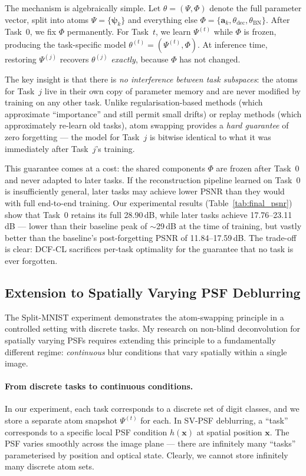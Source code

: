 \documentclass[11pt,letterpaper]{article}
\newcommand{\avec}{\mathbf{a}}
\newcommand{\psivec}{\boldsymbol{\psi}}
\begin{document}
The mechanism is algebraically simple.  Let
$\theta = (\Psi, \Phi)$ denote the full parameter vector, split into atoms
$\Psi = \{\psivec_k\}$ and everything else
$\Phi = \{\avec_k, \theta_\text{dec}, \theta_\text{BN}\}$.  After Task~0, we
fix $\Phi$ permanently.  For Task~$t$, we learn $\Psi^{(t)}$ while $\Phi$
is frozen, producing the task-specific model
$\theta^{(t)} = (\Psi^{(t)}, \Phi)$.  At inference time, restoring
$\Psi^{(j)}$ recovers $\theta^{(j)}$ \emph{exactly}, because $\Phi$ has not
changed.

The key insight is that there is \emph{no interference between task
subspaces}: the atoms for Task~$j$ live in their own copy of parameter memory
and are never modified by training on any other task.  Unlike
regularisation-based methods (which approximate ``importance'' and still permit
small drifts) or replay methods (which approximately re-learn old tasks), atom
swapping provides a \emph{hard guarantee} of zero forgetting --- the model for
Task~$j$ is bitwise identical to what it was immediately after Task~$j$'s
training.

This guarantee comes at a cost: the shared components $\Phi$ are frozen after
Task~0 and never adapted to later tasks.  If the reconstruction pipeline
learned on Task~0 is insufficiently general, later tasks may achieve lower
PSNR than they would with full end-to-end training.  Our experimental results
(Table~\ref{tab:final_psnr}) show that Task~0 retains its full 28.90\,dB,
while later tasks achieve 17.76--23.11\,dB --- lower than their baseline
peak of $\sim$29\,dB at the time of training, but vastly better than the
baseline's post-forgetting PSNR of 11.84--17.59\,dB.  The trade-off is clear:
DCF-CL sacrifices per-task optimality for the guarantee that no task is ever
forgotten.

\subsection{Extension to Spatially Varying PSF Deblurring}
\label{sec:disc_svpsf}

The Split-MNIST experiment demonstrates the atom-swapping principle in a
controlled setting with discrete tasks.  My research on non-blind
deconvolution for spatially varying PSFs requires extending this principle to
a fundamentally different regime: \emph{continuous} blur conditions that
vary spatially within a single image.

\paragraph{From discrete tasks to continuous conditions.}
In our experiment, each task corresponds to a discrete set of digit classes,
and we store a separate atom snapshot $\Psi^{(t)}$ for each.  In SV-PSF
deblurring, a ``task'' corresponds to a specific local PSF condition
$h(\mathbf{x})$ at spatial position $\mathbf{x}$.  The PSF varies smoothly
across the image plane --- there are infinitely many ``tasks'' parameterised
by position and optical state.  Clearly, we cannot store infinitely many
discrete atom sets.
\end{document}
